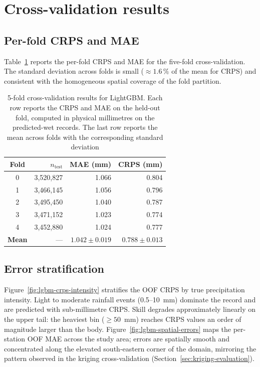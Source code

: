\clearpage

\section{Cross-validation results}
\label{sec:lgbm-cv-results}

\subsection{Per-fold CRPS and MAE}
\label{sec:lgbm-perfold}

Table~\ref{tab:lgbm-cv} reports the per-fold CRPS and MAE for the
five-fold cross-validation. The standard deviation across folds is
small (${\approx}1{.}6\,\%$ of the mean for CRPS) and consistent
with the homogeneous spatial coverage of the fold partition.

\begin{table}[ht]
  \centering
  \caption{5-fold cross-validation results for LightGBM. Each row
  reports the CRPS and MAE on the held-out fold, computed in
  physical millimetres on the predicted-wet records. The last row
  reports the mean across folds with the corresponding standard
  deviation}
  \label{tab:lgbm-cv}
  \begin{tabular}{c r r r}
    \toprule
    Fold & $n_{\mathrm{test}}$ & MAE (mm) & CRPS (mm) \\
    \midrule
    0 & 3{,}520{,}827 & 1.066 & 0.804 \\
    1 & 3{,}466{,}145 & 1.056 & 0.796 \\
    2 & 3{,}495{,}450 & 1.040 & 0.787 \\
    3 & 3{,}471{,}152 & 1.023 & 0.774 \\
    4 & 3{,}452{,}880 & 1.024 & 0.777 \\
    \midrule
    \textbf{Mean} & --- & $\mathbf{1.042 \pm 0.019}$
                       & $\mathbf{0.788 \pm 0.013}$ \\
    \bottomrule
  \end{tabular}
\end{table}


\subsection{Error stratification}
\label{sec:lgbm-errors}

Figure~\ref{fig:lgbm-crps-intensity} stratifies the OOF CRPS by
true precipitation intensity. Light to moderate rainfall events
(0.5--10~mm) dominate the record and are predicted with
sub-millimetre CRPS. Skill degrades approximately linearly on the
upper tail: the heaviest bin ($\geq 50$~mm) reaches CRPS values an
order of magnitude larger than the body.
Figure~\ref{fig:lgbm-spatial-errors} maps the per-station OOF MAE
across the study area; errors are spatially smooth and concentrated
along the elevated south-eastern corner of the domain, mirroring
the pattern observed in the kriging cross-validation
(Section~\ref{sec:kriging-evaluation}).

